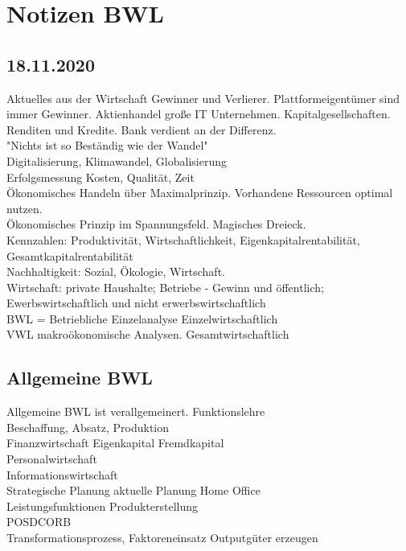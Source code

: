\documentclass{article}
\begin{document}
	\section*{Notizen BWL}
	\subsection*{18.11.2020}
	Aktuelles aus der Wirtschaft Gewinner und Verlierer.
	Plattformeigentümer sind immer Gewinner.
	Aktienhandel große IT Unternehmen. Kapitalgesellschaften. \\
	Renditen und Kredite. Bank verdient an der Differenz. \\
	"Nichts ist so Beständig wie der Wandel" \\
	Digitalisierung, Klimawandel, Globalisierung \\
	Erfolgsmessung Kosten, Qualität, Zeit \\
	Ökonomisches Handeln über Maximalprinzip. Vorhandene Ressourcen optimal nutzen. \\
	Ökonomisches Prinzip im Spannungsfeld. Magisches Dreieck. \\
	Kennzahlen: Produktivität, Wirtschaftlichkeit, Eigenkapitalrentabilität, Gesamtkapitalrentabilität \\
	Nachhaltigkeit: Sozial, Ökologie, Wirtschaft. \\
	Wirtschaft: private Haushalte; Betriebe - Gewinn und öffentlich; \\
	Ewerbswirtschaftlich und nicht erwerbswirtschaftlich \\
	BWL = Betriebliche Einzelanalyse Einzelwirtschaftlich \\
	VWL makroökonomische Analysen. Gesamtwirtschaftlich \\
	
	\subsection*{Allgemeine BWL}
	Allgemeine BWL ist verallgemeinert. Funktionslehre \\
	Beschaffung, Absatz, Produktion \\
	Finanzwirtschaft Eigenkapital Fremdkapital \\
	Personalwirtschaft \\
	Informationswirtschaft \\
	Strategische Planung aktuelle Planung Home Office \\
	Leistungsfunktionen Produkterstellung \\
	POSDCORB \\
	Transformationsprozess, Faktoreneinsatz Outputgüter erzeugen \\
\end{document}
